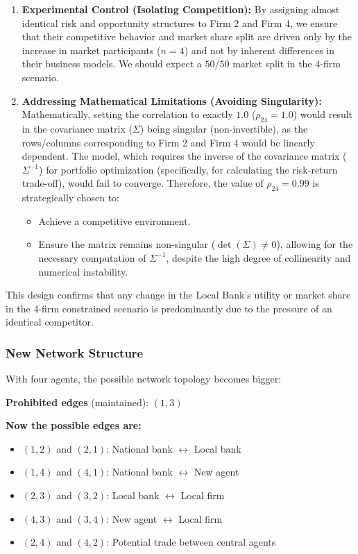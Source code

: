 \begin{enumerate}
    \item \textbf{Experimental Control (Isolating Competition):} By assigning almost identical risk and opportunity structures to Firm 2 and Firm 4, we ensure that their competitive behavior and market share split are driven only by the increase in market participants ($n=4$) and not by inherent differences in their business models. We should expect a $50/50$ market split in the $4$-firm scenario.
    
    \item \textbf{Addressing Mathematical Limitations (Avoiding Singularity):} Mathematically, setting the correlation to exactly $1.0$ ($\rho_{24} = 1.0$) would result in the covariance matrix ($\Sigma$) being singular (non-invertible), as the rows/columns corresponding to Firm 2 and Firm 4 would be linearly dependent. The model, which requires the inverse of the covariance matrix ($\Sigma^{-1}$) for portfolio optimization (specifically, for calculating the risk-return trade-off), would fail to converge. Therefore, the value of $\rho_{24} = 0.99$ is strategically chosen to:
    \begin{itemize}
        \item Achieve a competitive environment.
        \item Ensure the matrix remains non-singular ($\det(\Sigma) \neq 0$), allowing for the necessary computation of $\Sigma^{-1}$, despite the high degree of collinearity and numerical instability.
    \end{itemize}
\end{enumerate}

This design confirms that any change in the Local Bank's utility or market share in the 4-firm constrained scenario is predominantly due to the pressure of an identical competitor.


\subsubsection{New Network Structure}

With four agents, the possible network topology becomes bigger:

\textbf{Prohibited edges} (maintained): $(1,3)$

\textbf{Now the possible edges are:}
\begin{itemize}
    \item $(1,2)$ and $(2,1)$: National bank $\leftrightarrow$ Local bank
    \item $(1,4)$ and $(4,1)$: National bank $\leftrightarrow$ New agent
    \item $(2,3)$ and $(3,2)$: Local bank $\leftrightarrow$ Local firm
    \item $(4,3)$ and $(3,4)$: New agent $\leftrightarrow$ Local firm
    \item $(2,4)$ and $(4,2)$: Potential trade between central agents
\end{itemize}


